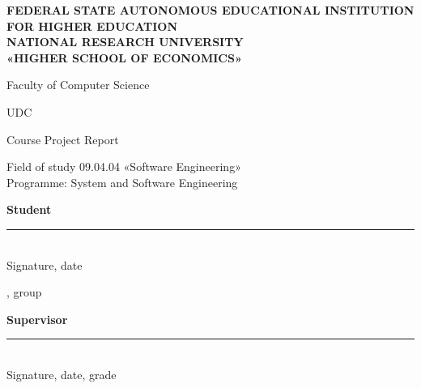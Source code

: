 \begin{titlepage}
\thispagestyle{empty}
\singlespacing
\setlength{\parindent}{0pt}
\setlength{\parskip}{0pt}

\begin{center}
\textbf{FEDERAL STATE AUTONOMOUS EDUCATIONAL INSTITUTION}\\
\textbf{FOR HIGHER EDUCATION}\\
\textbf{NATIONAL RESEARCH UNIVERSITY}\\
\textbf{«HIGHER SCHOOL OF ECONOMICS»}

\vspace{0.3cm}
Faculty of Computer Science
\end{center}

\vspace{0.4cm}
\noindent UDC~\hseUDC

\vspace{2cm}
\begin{center}
{\large\foreignlanguage{russian}{\hseAuthorName}}

\vspace{1.2cm}
{\large\textbf{\hseTitleEn}}

\vspace{0.4cm}
{\foreignlanguage{russian}{\hseTitleRu}}

\vspace{1.2cm}
Course Project Report

\vspace{0.3cm}
Field of study 09.04.04 «Software Engineering»\\
Programme: System and Software Engineering
\end{center}

\vfill
\noindent
\begin{minipage}[t]{0.42\textwidth}
\raggedright
\textbf{Student}\\[0.6cm]
%
\rule{5cm}{0.4pt}\\[-0.1cm]
{\scriptsize Signature, date}

\vspace{0.2cm}
\foreignlanguage{russian}{\hseAuthorName}, group \foreignlanguage{russian}{\hseGroup}
\end{minipage}
\hfill
\begin{minipage}[t]{0.5\textwidth}
\raggedright
\textbf{Supervisor}\\[0.6cm]
%
\rule{5cm}{0.4pt}\\[-0.1cm]
{\scriptsize Signature, date, grade}


\end{minipage}
\end{titlepage}
